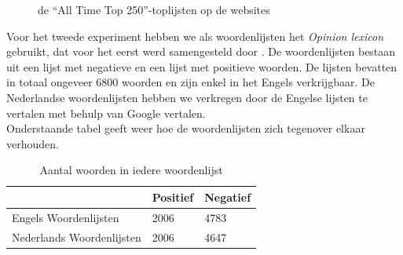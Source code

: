 \newpage
\begin{figure}%
    \centering
    \caption{de ``All Time Top 250''-toplijsten op de websites}%
\end{figure}


Voor het tweede experiment hebben we als woordenlijsten het \textit{Opinion lexicon} gebruikt, dat voor het eerst werd samengesteld door \cite{hu2004mining}. De woordenlijsten bestaan uit een lijst met negatieve en een lijst met positieve woorden. De lijsten bevatten in totaal ongeveer 6800 woorden en zijn enkel in het Engels verkrijgbaar. De Nederlandse woordenlijsten hebben we verkregen door de Engelse lijsten te vertalen met behulp van Google vertalen.\\

Onderstaande tabel geeft weer hoe de woordenlijsten zich tegenover elkaar verhouden.

\begin{table}[]
\centering
\caption{Aantal woorden in iedere woordenlijst}
\label{my-label}
\begin{tabular}{l|l|l|}
\cline{2-3}
 & Positief & Negatief \\ \hline
\multicolumn{1}{|l|}{Engels Woordenlijsten}     & 2006     & 4783     \\ \hline
\multicolumn{1}{|l|}{Nederlands Woordenlijsten} & 2006     & 4647     \\ \hline
\end{tabular}
\end{table}

